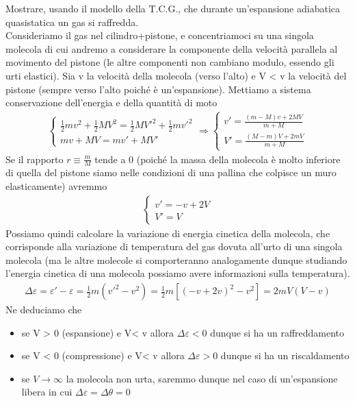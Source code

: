 \documentclass[
10pt, %
a4paper, %
oneside, %
headinclude,footinclude, %
BCOR5mm, %
]{scrartcl}
\begin{document}
\begin{exercise}
	Mostrare, usando il modello della T.C.G., che durante un’espansione adiabatica quasistatica
	un gas si raffredda.\\
	Consideriamo il gas nel cilindro+pistone, e concentriamoci su una singola molecola di cui andremo	a considerare la componente della velocità parallela al movimento del pistone (le altre componenti non cambiano modulo, essendo gli urti elastici). Sia v la velocità della molecola (verso l’alto) e V < v la velocità del pistone (sempre verso l’alto poiché è un'espansione). Mettiamo a sistema conservazione dell'energia e della quantità di moto
	\begin{align*}
		\begin{cases}
			\frac{1}{2} m v^2 + \frac{1}{2}M V^2 = \frac{1}{2}M V'^2+\frac{1}{2}m v'^2\\
			m v + M V = m v' + M V'
		\end{cases} \Rightarrow 
		\begin{cases}
			v' = \frac{(m - M) v + 2 M V}{m + M}\\
			V' = \frac{(M - m)V + 2m V}{m + M}
		\end{cases}
	\end{align*}
	Se il rapporto \(r \equiv \frac{m}{M}\) tende a 0 (poiché la massa della molecola è molto inferiore di quella del pistone siamo nelle condizioni di una pallina che colpisce un muro elasticamente) avremmo
	\begin{align*}
		\begin{cases}
			v' = -v + 2 V\\
			V' = V
		\end{cases}
	\end{align*}
	Possiamo quindi calcolare la variazione di energia cinetica della molecola, che corrisponde alla variazione di temperatura del gas dovuta all'urto di una singola molecola (ma le altre molecole si comporteranno analogamente dunque studiando l'energia cinetica di una molecola possiamo avere informazioni sulla temperatura). 
	\begin{align*}
		\Delta\varepsilon = \varepsilon' - \varepsilon = \frac{1}{2} m (v'^2 - v^2) = \frac{1}{2} m [(-v+2v)^2 - v^2] = 2 m V (V - v)
	\end{align*}
	Ne deduciamo che 
	\begin{itemize}
		\item se V > 0 (espansione) e V< v allora $\Delta\varepsilon < 0$ dunque si ha un raffreddamento
		\item se V < 0 (compressione) e V< v allora $\Delta\varepsilon > 0$ dunque si ha un riscaldamento
		\item se $V\to\infty$ la molecola non urta, saremmo dunque nel caso di un'espansione libera in cui  $\Delta\varepsilon = \Delta \theta = 0$
	\end{itemize}
\end{exercise}
\end{document}
